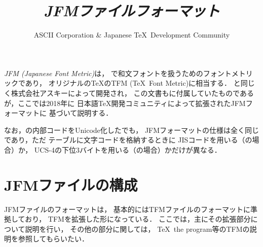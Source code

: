 \documentclass[a4paper,11pt,nomag]{jsarticle}
\title{\emph{JFMファイルフォーマット}}
\author{ASCII Corporation \& Japanese \TeX\ Development Community}
\begin{document}
\maketitle

\emph{JFM (Japanese Font Metric)}は，
\pTeX で和文フォントを扱うためのフォントメトリックであり，
オリジナルの\TeX のTFM (\TeX\ Font Metric)に相当する．
\pTeX と同じく株式会社アスキーによって開発され，
この文書も\pTeX に付属していたものであるが，ここでは2018年に
日本語\TeX 開発コミュニティによって拡張されたJFMフォーマットに
基づいて説明する．

なお，\pTeX の内部コードをUnicode化した\upTeX でも，
JFMフォーマットの仕様は全く同じであり，ただ
テーブルに文字コードを格納するときに
JISコードを用いる（\pTeX の場合）か，
UCS-4の下位3バイトを用いる（\upTeX の場合）かだけが異なる．

\tableofcontents
\clearpage

\section{JFMファイルの構成}\label{jfm-format}

JFMファイルのフォーマットは，
基本的にはTFMファイルのフォーマットに準拠しており，
TFMを拡張した形になっている．
ここでは，主にその拡張部分について説明を行い，
その他の部分に関しては，
\TeX\ the program等のTFMの説明を参照してもらいたい．
\end{document}

